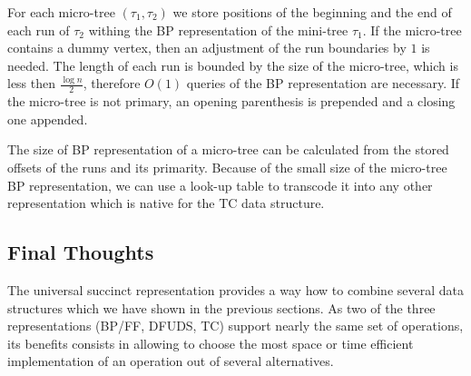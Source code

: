 For each micro-tree $(\tau_1, \tau_2)$ we store positions of the beginning and the end of each run of $\tau_2$ withing the BP representation of the mini-tree $\tau_1$.
If the micro-tree contains a dummy vertex, then an adjustment of the run boundaries by $1$ is needed.
The length of each run is bounded by the size of the micro-tree, which is less then $\frac{\log n}{2}$, therefore $O(1)$ queries of the BP representation are necessary.
If the micro-tree is not primary, an opening parenthesis is prepended and a closing one appended.

The size of BP representation of a micro-tree can be calculated from the stored offsets of the runs and its primarity.
Because of the small size of the micro-tree BP representation, we can use a look-up table to transcode it into any other representation which is native for the TC data structure.

\subsection{Final Thoughts}

The universal succinct representation provides a way how to combine several data structures which we have shown in the previous sections.
As two of the three representations (BP/FF, DFUDS, TC) support nearly the same set of operations, its benefits consists in allowing to choose the most space or time efficient implementation of an operation out of several alternatives.
